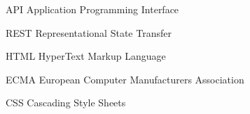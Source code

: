 \begin{siglas}
    \item[API] Application Programming Interface
    \item[REST] Representational State Transfer
    \item[HTML] HyperText Markup Language
    \item[ECMA] European Computer Manufacturers Association
    \item[CSS] Cascading Style Sheets 
\end{siglas}
